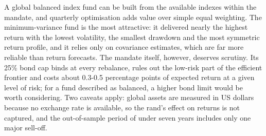 \documentclass[11pt,preprint]{elsarticle}
\numberwithin{equation}{section}
\numberwithin{figure}{section}
\numberwithin{table}{section}
\begin{document}
A global balanced index fund can be built from the available indexes
within the mandate, and quarterly optimisation adds value over simple
equal weighting. The minimum-variance fund is the most attractive: it
delivered nearly the highest return with the lowest volatility, the
smallest drawdown and the most symmetric return profile, and it relies
only on covariance estimates, which are far more reliable than return
forecasts. The mandate itself, however, deserves scrutiny. Its 25\% bond
cap binds at every rebalance, rules out the low-risk part of the
efficient frontier and costs about 0.3-0.5 percentage points of expected
return at a given level of risk; for a fund described as balanced, a
higher bond limit would be worth considering. Two caveats apply: global
assets are measured in US dollars because no exchange rate is available,
so the rand's effect on returns is not captured, and the out-of-sample
period of under seven years includes only one major sell-off.


\end{document}
